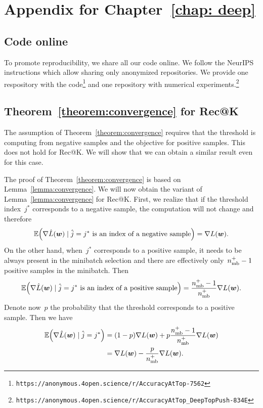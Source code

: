 \chapter{Appendix for Chapter~\ref{chap: deep}}

\section{Code online}

To promote reproducibility, we share all our code online. We follow the NeurIPS instructions which allow sharing only anonymized repositories. We provide one respository with the code\footnote{\texttt{https://anonymous.4open.science/r/AccuracyAtTop-7562}} and one repository with numerical experiments.\footnote{\texttt{https://anonymous.4open.science/r/AccuracyAtTop\_DeepTopPush-834E}}

\section{Theorem~\ref{theorem:convergence} for Rec@K}

The assumption of Theorem~\ref{theorem:convergence} requires that the threshold is computing from negative samples and the objective for positive samples. This does not hold for Rec@K. We will show that we can obtain a similar result even for this case.

The proof of Theorem~\ref{theorem:convergence} is based on Lemma~\ref{lemma:convergence}. We will now obtain the variant of Lemma~\ref{lemma:convergence} for Rec@K. First, we realize that if the threshold index~$j^*$ corresponds to a negative sample, the computation will not change and therefore
\begin{equation*}
  \EE\Brac{\nabla \hat L(\bm w) \mid \hat j=j^*\text{ is an index of a negative sample}}
  =  \nabla L(\bm w).
\end{equation*}
On the other hand, when~$j^*$ corresponds to a positive sample, it needs to be always present in the minibatch selection and there are effectively only~$n_{\rm mb}^+-1$ positive samples in the minibatch. Then
\begin{equation*}
  \EE\Brac{\nabla \hat L(\bm w) \mid \hat j=j^*\text{ is an index of a positive sample}}
  = \frac{\nmin^+-1}{\nmin^+}\nabla L(\bm w).
\end{equation*}
Denote now~$p$ the probability that the threshold corresponds to a positive sample. Then we have
\begin{equation*}
  \begin{aligned}
    \EE\Brac{\nabla \hat L(\bm w) \mid \hat j=j^*}
    & = (1-p)\nabla L(\bm w) + p\frac{\nmin^+-1}{\nmin^+}\nabla L(\bm w) \\
    & = \nabla L(\bm w) - \frac{p}{\nmin^+}\nabla L(\bm w).
\end{aligned}
\end{equation*}

